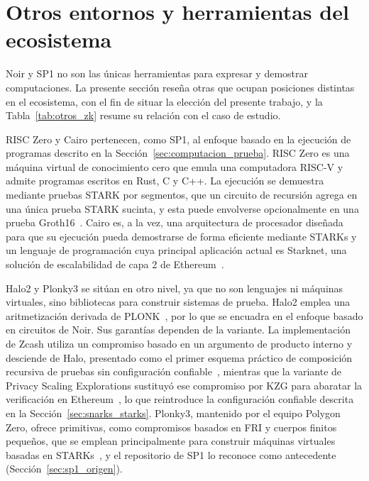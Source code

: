 \section{Otros entornos y herramientas del ecosistema}
\label{sec:otros_zk}

Noir y SP1 no son las únicas herramientas para expresar y demostrar computaciones. La presente
sección reseña otras que ocupan posiciones distintas en el ecosistema, con el fin de situar la
elección del presente trabajo, y la Tabla~\ref{tab:otros_zk} resume su relación con el caso de
estudio.

RISC Zero y Cairo pertenecen, como SP1, al enfoque basado en la ejecución de programas descrito en
la Sección~\ref{sec:computacion_prueba}. RISC Zero es una máquina virtual de conocimiento cero que
emula una computadora RISC-V y admite programas escritos en Rust, C y C++. La ejecución se
demuestra mediante pruebas STARK por segmentos, que un circuito de recursión agrega en una única
prueba STARK sucinta, y esta puede envolverse opcionalmente en una prueba
Groth16~\cite{risczerorepo, risczerodocs}. Cairo es, a la vez, una arquitectura de procesador diseñada para que su ejecución
pueda demostrarse de forma eficiente mediante STARKs y un lenguaje de programación cuya principal
aplicación actual es Starknet, una solución de escalabilidad de capa 2 de
Ethereum~\cite{goldberg2021cairo, cairobook}.

Halo2 y Plonky3 se sitúan en otro nivel, ya que no son lenguajes ni máquinas virtuales, sino
bibliotecas para construir sistemas de prueba. Halo2 emplea una aritmetización derivada de
PLONK~\cite{halo2book}, por lo que se encuadra en el enfoque basado en circuitos de Noir. Sus
garantías dependen de la variante. La implementación de Zcash utiliza un compromiso basado en un
argumento de producto interno y desciende de Halo, presentado como el primer esquema práctico de
composición recursiva de pruebas sin configuración confiable~\cite{halo2book, bowe2019halo},
mientras que la variante de Privacy Scaling Explorations sustituyó ese compromiso por KZG para
abaratar la verificación en Ethereum~\cite{psehalo2}, lo que reintroduce la configuración confiable
descrita en la Sección~\ref{sec:snarks_starks}. Plonky3, mantenido por el equipo Polygon Zero,
ofrece primitivas, como compromisos basados en FRI y cuerpos finitos pequeños, que se emplean
principalmente para construir máquinas virtuales basadas en STARKs~\cite{plonky3repo}, y el
repositorio de SP1 lo reconoce como antecedente (Sección~\ref{sec:sp1_origen}).

